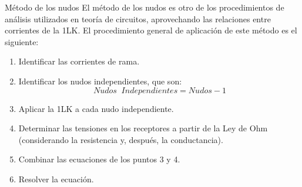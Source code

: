 \documentclass[11pt]{book} %
\makeatletter
\numberwithin{dummy}{section}
\theoremstyle{ocrenumbox}
\theoremstyle{blacknumex}
\theoremstyle{blacknumbox}
\theoremstyle{ocrenum}
\renewcommand{\subsection}{\@startsection {subsection}{2}{\z@}
{-3ex \@plus -0.1ex \@minus -.4ex}
{0.5ex \@plus.2ex }
{\normalfont\sffamily\bfseries}}
\newlength\esp
\makeatother
\begin{document}
	\subsection{Método de los nudos}
	El método de los nudos es otro de los procedimientos de análisis utilizados en teoría de circuitos, aprovechando las relaciones entre corrientes de la 1LK. El procedimiento general de aplicación de este método es el siguiente:
	\begin{enumerate}
		\item Identificar las corrientes de rama.
		\item Identificar los nudos independientes, que son:
		\begin{equation}
			\boxed{Nudos\;\;Independientes=Nudos-1}
		\end{equation}
		\item Aplicar la 1LK a cada nudo independiente.
		\item Determinar las tensiones en los receptores a partir de la Ley de Ohm (considerando la resistencia y, después, la conductancia).
		\item Combinar las ecuaciones de los puntos 3 y 4.
		\item Resolver la ecuación.
	\end{enumerate}
	
\end{document}

